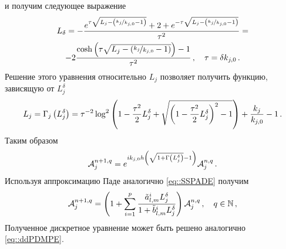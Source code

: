 \documentclass[../document.tex]{subfiles}
\begin{document}
            и получим следующее выражение
            \begin{multline}
                L_\delta=-\frac{e^{\tau\sqrt{L_j-\left(\nicefrac{k_j}{k_{j,0}}-1\right)}}+2+e^{-\tau\sqrt{L_j-\left(\nicefrac{k_j}{k_{j,0}}-1\right)}}}{\tau^2}=\\
                -2\frac{\cosh\left(\tau\sqrt{L_j-\left(\nicefrac{k_j}{k_{j,0}}-1\right)}\right)-1}{\tau^2}\,,\quad\tau=\delta k_{j,0}\,.
            \end{multline}
            Решение этого уравнения относительно $L_j$ позволяет получить функцию, зависящую от $L_j^\delta$
            \begin{equation}
                L_j=\Gamma_j\left(L_j^\delta\right)=\tau^{-2}\log^2\left(1-\frac{\tau^2}{2}L_j^\delta+\sqrt{\left(1-\frac{\tau^2}{2}L_j^\delta\right)^2-1}\right)+\frac{k_j}{k_{j,0}}-1\,.
            \end{equation}
            Таким образом 
            \begin{equation}
                \mathcal{A}_j^{n+1,q}=e^{ik_{j,0}h\left(\sqrt{1+\Gamma\left(L_j^\delta\right)}-1\right)}\mathcal{A}_j^{n,q}\,.
            \end{equation}
            Используя аппроксимацию Паде аналогично \eqref{eq::SSPADE} получим
            \begin{equation}
                \mathcal{A}_j^{n+1,q}=\left(1+\sum\limits_{i=1}^p\frac{\tilde{a}_{l,m}^iL_j^\delta}{1+\tilde{b}_{l,m}^iL_j^\delta}\right)\mathcal{A}_j^{n,q}\,,\quad q\in\mathbb{N}\,,
            \end{equation}
            Полученное дискретное уравнение может быть решено аналогично \eqref{eq::ddPDMPE}.
\end{document}
